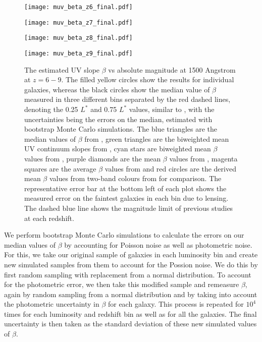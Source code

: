 \documentclass[twocolumn]{aastex63}
\begin{document}
\begin{figure*}
\centering
\begin{minipage}{0.45\textwidth}
\centering
\texttt{[image: muv\_beta\_z6\_final.pdf]}
\end{minipage}
\begin{minipage}{0.45\textwidth}
\centering
\texttt{[image: muv\_beta\_z7\_final.pdf]}
\end{minipage}
\begin{minipage}{0.45\textwidth}
\centering
\texttt{[image: muv\_beta\_z8\_final.pdf]}
\end{minipage}
\begin{minipage}{0.45\textwidth}
\centering
\texttt{[image: muv\_beta\_z9\_final.pdf]}
\end{minipage}
\caption{The estimated UV slope $\beta$ vs absolute magnitude at 1500 Angstrom at $z=6-9$. The filled yellow circles show the results for individual galaxies, whereas the black circles
show the median value of $\beta$ measured in three different bins separated by the red dashed lines, denoting the 0.25 $L^{*}$ and 0.75 $L^{*}$ values, similar to \citet{Finkelstein2012}, with the uncertainties being the errors on the median, estimated with bootstrap Monte Carlo simulations. The blue triangles are the median values of $\beta$ from \citet{Finkelstein2012}, green triangles are the biweighted mean UV continuum slopes from \citet{Bouwens2012}, cyan stars are biweighted mean $\beta$ values from \citet{Bouwens2014b}, purple diamonds are the mean $\beta$ values from \citet{Wilkins2011}, magenta squares are the average $\beta$ values from \citet{Dunlop2012} and red circles are the derived mean $\beta$ values from two-band colours from \citet{Dunlop2013} for comparison. The representative error bar at the bottom left of each plot shows the measured error on the faintest galaxies in each bin due to lensing. The dashed blue line shows the magnitude limit of previous studies at each redshift.}
\label{fig:uv_beta}
\end{figure*}

We perform bootstrap Monte Carlo simulations to calculate the errors on our median values of $\beta$ by accounting for Poisson noise as well as photometric noise. For this, we take our original sample of galaxies in each luminosity bin and create new simulated samples from them to account for the Possion noise. We do this by first random sampling with replacement from a normal distribution. To account for the photometric error, we then take this modified sample and remeasure $\beta$, again by random sampling from a normal distribution and by taking into account the photometric uncertainty in $\beta$ for each galaxy. This process is repeated for $10^{4}$ times for each luminosity and redshift bin as well as for all the galaxies. The final uncertainty is then taken as the standard deviation of these new simulated values of $\beta$.
\end{document}
